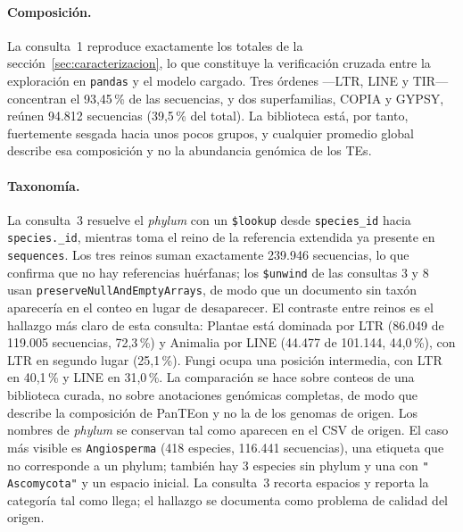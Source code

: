 \documentclass[journal]{IEEEtran}
\begin{document}
\paragraph*{Composición.}
La consulta~1 reproduce exactamente los totales de la
sección~\ref{sec:caracterizacion}, lo que constituye la verificación cruzada entre la
exploración en \texttt{pandas} y el modelo cargado. Tres órdenes ---LTR, LINE y TIR---
concentran el 93,45\,\% de las secuencias, y dos superfamilias, COPIA y GYPSY, reúnen
94.812 secuencias (39,5\,\% del total). La biblioteca está, por tanto, fuertemente sesgada
hacia unos pocos grupos, y cualquier promedio global describe esa composición y no la
abundancia genómica de los TEs.

\paragraph*{Taxonomía.}
La consulta~3 resuelve el \textit{phylum} con un \texttt{\$lookup} desde \texttt{species\_id}
hacia \texttt{species.\_id}, mientras toma el reino de la referencia extendida ya presente
en \texttt{sequences}. Los tres reinos suman exactamente 239.946 secuencias, lo que
confirma que no hay referencias huérfanas; los \texttt{\$unwind} de las consultas 3 y 8 usan
\texttt{preserveNullAndEmptyArrays}, de modo que un documento sin taxón aparecería en el
conteo en lugar de desaparecer. El contraste entre reinos es el hallazgo más claro de esta
consulta: Plantae está dominada por LTR (86.049 de 119.005 secuencias, 72,3\,\%) y Animalia
por LINE (44.477 de 101.144, 44,0\,\%), con LTR en segundo lugar (25,1\,\%). Fungi ocupa
una posición intermedia, con LTR en 40,1\,\% y LINE en 31,0\,\%. La comparación se hace
sobre conteos de una biblioteca curada, no sobre anotaciones genómicas completas, de modo
que describe la composición de PanTEon y no la de los genomas de origen. Los nombres de
\textit{phylum} se conservan tal como aparecen en el CSV de origen. El caso más visible es
\texttt{Angiosperma} (418 especies, 116.441 secuencias), una etiqueta que no corresponde a
un phylum; también hay 3 especies sin phylum y una con \texttt{"{} Ascomycota"} y un
espacio inicial. La consulta~3 recorta espacios y reporta la categoría tal como llega; el
hallazgo se documenta como problema de calidad del origen.
\end{document}
